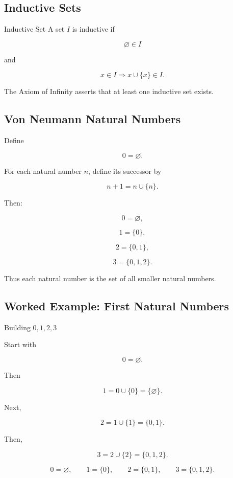 \subsection{Inductive Sets}
\label{subsec:inductive-sets}

\begin{definitionbox}{Inductive Set}
A set \(I\) is inductive if

\[
\varnothing\in I
\]

and

\[
x\in I
\Longrightarrow
x\cup\{x\}\in I.
\]
\end{definitionbox}

The Axiom of Infinity asserts that at least one inductive set exists.

\subsection{Von Neumann Natural Numbers}
\label{subsec:von-neumann-natural-numbers}

Define

\[
\boxed{
0
=
\varnothing.
}
\]

For each natural number \(n\), define its successor by

\[
\boxed{
n+1
=
n\cup\{n\}.
}
\]

Then:

\[
0=\varnothing,
\]

\[
1=\{0\},
\]

\[
2=\{0,1\},
\]

\[
3=\{0,1,2\}.
\]

Thus each natural number is the set of all smaller natural numbers.

\subsection{Worked Example: First Natural Numbers}
\label{subsec:worked-von-neumann-naturals}

\begin{workedexamplebox}{Building \(0,1,2,3\)}

Start with

\[
0=\varnothing.
\]

Then

\[
1
=
0\cup\{0\}
=
\{\varnothing\}.
\]

Next,

\[
2
=
1\cup\{1\}
=
\{0,1\}.
\]

Then,

\[
3
=
2\cup\{2\}
=
\{0,1,2\}.
\]

\begin{answerbox}
\[
\boxed{
0=\varnothing,
\qquad
1=\{0\},
\qquad
2=\{0,1\},
\qquad
3=\{0,1,2\}.
}
\]
\end{answerbox}

\end{workedexamplebox}

